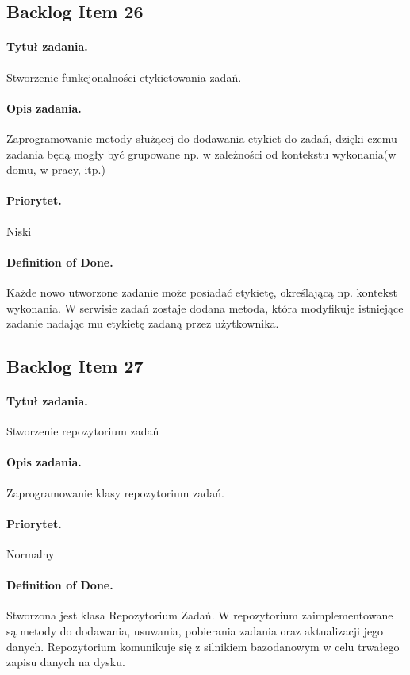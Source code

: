 \documentclass[a4paper]{article}
\begin{document}
\subsection{Backlog Item 26} 
\paragraph{Tytuł zadania.} Stworzenie funkcjonalności etykietowania zadań.
\paragraph{Opis zadania.} Zaprogramowanie metody służącej do dodawania etykiet do zadań, dzięki czemu zadania będą mogły być grupowane np. w zależności od kontekstu wykonania(w domu, w pracy, itp.)
\paragraph{Priorytet.} Niski
\paragraph{Definition of Done.} Każde nowo utworzone zadanie może posiadać etykietę, określającą np. kontekst wykonania. W serwisie zadań zostaje dodana metoda, która modyfikuje istniejące zadanie nadając mu etykietę zadaną przez użytkownika.

\subsection{Backlog Item 27} 
\paragraph{Tytuł zadania.} Stworzenie repozytorium zadań 
\paragraph{Opis zadania.} Zaprogramowanie klasy repozytorium zadań.
\paragraph{Priorytet.} Normalny
\paragraph{Definition of Done.} Stworzona jest klasa Repozytorium Zadań. W repozytorium zaimplementowane są metody do dodawania, usuwania, pobierania zadania  oraz aktualizacji jego danych. Repozytorium komunikuje się z silnikiem bazodanowym w celu trwałego zapisu danych na dysku.
\end{document}
